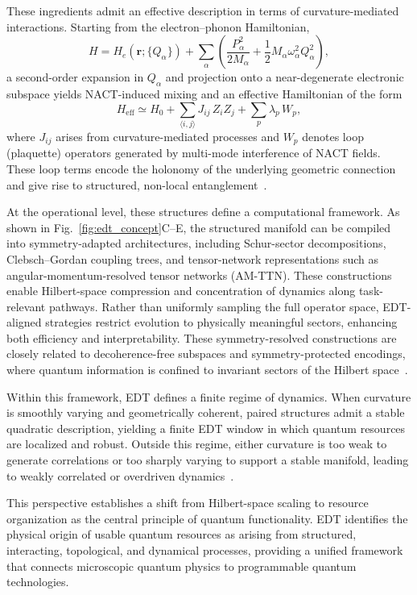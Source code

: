 \documentclass[twocolumn,10pt]{article}
\begin{document}
These ingredients admit an effective description in terms of curvature-mediated interactions. Starting from the electron--phonon Hamiltonian,
\begin{equation}
H = H_e(\mathbf{r};\{Q_\alpha\}) + \sum_\alpha \left(\frac{P_\alpha^2}{2M_\alpha} + \frac{1}{2} M_\alpha \omega_\alpha^2 Q_\alpha^2\right),
\end{equation}
a second-order expansion in $Q_\alpha$ and projection onto a near-degenerate electronic subspace yields NACT-induced mixing and an effective Hamiltonian of the form
\begin{equation}
H_{\mathrm{eff}} \simeq H_0 + \sum_{\langle i,j\rangle} J_{ij}\, Z_i Z_j
+ \sum_p \lambda_p\, W_p,
\end{equation}
where $J_{ij}$ arises from curvature-mediated processes and $W_p$ denotes loop (plaquette) operators generated by multi-mode interference of NACT fields. These loop terms encode the holonomy of the underlying geometric connection and give rise to structured, non-local entanglement~\cite{BardeenPines1955,BCS1957}.

At the operational level, these structures define a computational framework. As shown in Fig.~\ref{fig:edt_concept}C–E, the structured manifold can be compiled into symmetry-adapted architectures, including Schur-sector decompositions, Clebsch–Gordan coupling trees, and tensor-network representations such as angular-momentum-resolved tensor networks (AM-TTN). These constructions enable Hilbert-space compression and concentration of dynamics along task-relevant pathways. Rather than uniformly sampling the full operator space, EDT-aligned strategies restrict evolution to physically meaningful sectors, enhancing both efficiency and interpretability. These symmetry-resolved constructions are closely related to decoherence-free subspaces and symmetry-protected encodings, where quantum information is confined to invariant sectors of the Hilbert space~\cite{Bacon2006}.

Within this framework, EDT defines a finite regime of dynamics. When curvature is smoothly varying and geometrically coherent, paired structures admit a stable quadratic description, yielding a finite EDT window in which quantum resources are localized and robust. Outside this regime, either curvature is too weak to generate correlations or too sharply varying to support a stable manifold, leading to weakly correlated or overdriven dynamics~\cite{Larkin1969,Swingle2018}.

This perspective establishes a shift from Hilbert-space scaling to resource organization as the central principle of quantum functionality. EDT identifies the physical origin of usable quantum resources as arising from structured, interacting, topological, and dynamical processes, providing a unified framework that connects microscopic quantum physics to programmable quantum technologies.
\end{document}
